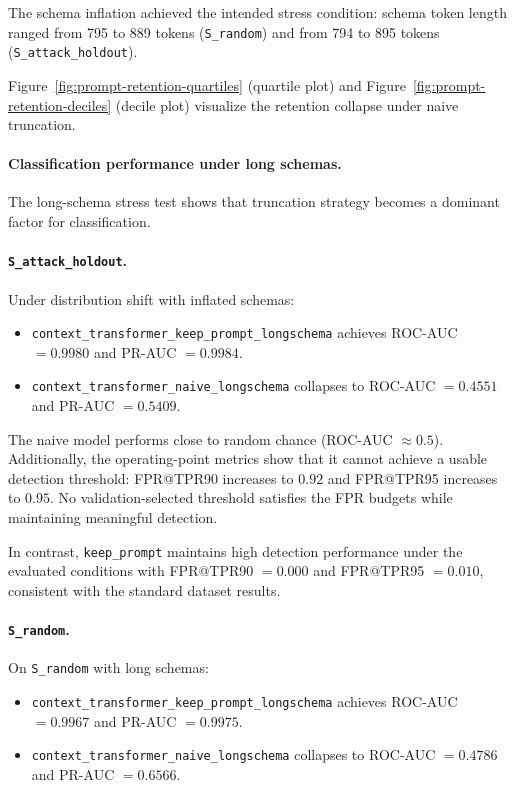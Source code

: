 The schema inflation achieved the intended stress condition: schema token length ranged from 795 to 889 tokens (\texttt{S\_random}) and from 794 to 895 tokens (\texttt{S\_attack\_holdout}).

Figure~\ref{fig:prompt-retention-quartiles} (quartile plot) and Figure~\ref{fig:prompt-retention-deciles} (decile plot) visualize the retention collapse under naive truncation.

\paragraph{Classification performance under long schemas.}
The long-schema stress test shows that truncation strategy becomes a dominant factor for classification.

\paragraph{\texttt{S\_attack\_holdout}.}
Under distribution shift with inflated schemas:

\begin{itemize}
    \item \texttt{context\_transformer\_keep\_prompt\_longschema} achieves ROC-AUC $=0.9980$ and PR-AUC $=0.9984$.
    \item \texttt{context\_transformer\_naive\_longschema} collapses to ROC-AUC $=0.4551$ and PR-AUC $=0.5409$.
\end{itemize}

The naive model performs close to random chance (ROC-AUC $\approx 0.5$). Additionally, the operating-point metrics show that it cannot achieve a usable detection threshold: FPR@TPR90 increases to $0.92$ and FPR@TPR95 increases to $0.95$. No validation-selected threshold satisfies the FPR budgets while maintaining meaningful detection.

In contrast, \texttt{keep\_prompt} maintains high detection performance under the evaluated conditions with FPR@TPR90 $=0.000$ and FPR@TPR95 $=0.010$, consistent with the standard dataset results.

\paragraph{\texttt{S\_random}.}
On \texttt{S\_random} with long schemas:

\begin{itemize}
    \item \texttt{context\_transformer\_keep\_prompt\_longschema} achieves ROC-AUC $=0.9967$ and PR-AUC $=0.9975$.
    \item \texttt{context\_transformer\_naive\_longschema} collapses to ROC-AUC $=0.4786$ and PR-AUC $=0.6566$.
\end{itemize}

